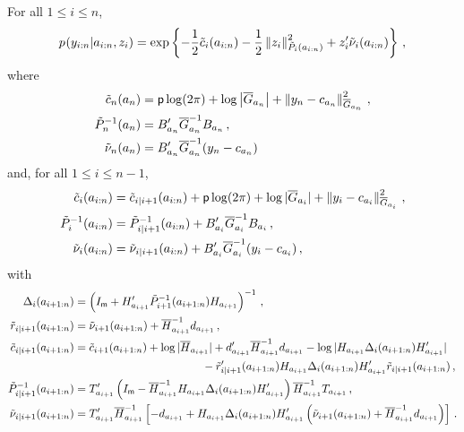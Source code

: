 \begin{lemma}
\label{lem:py}
For all $1\le i \le n$,
\begin{equation}
\label{eq:py}
p_{}(y_{i:n}|a_{i:n},z_i) =  \exp\left\{-\frac{1}{2}\tilde{c}_{i}(a_{i:n}) - \frac{1}{2}\normMat{\tilde{P}_{i}(a_{i:n})}{z_i}^2 + z'_i\tilde{\nu}_{i}(a_{i:n})\right\}\eqsp,
\end{equation}
where
\begin{align}
\tilde{c}_{n}(a_{n}) &= \dimy\log(2\pi) + \log \left|\barG_{a_n}\right| + \normMat{\barG_{a_n}}{y_n-c_{a_n}}^2\eqsp,\label{eq:cn}\\
\tilde{P}_{n}^{-1}(a_{n}) &=B'_{a_n}\barG_{a_n}^{-1}B_{a_n}\eqsp,\label{eq:Pn}\\
\tilde{\nu}_{n}(a_{n})&=B'_{a_n}\barG_{a_n}^{-1}(y_n-c_{a_n})\label{eq:nun}
\end{align}
and, for all $1\le i\le n-1$,
\begin{align}
\tilde{c}_{i}(a_{i:n}) &= \tilde{c}_{i|i+1}(a_{i:n}) + \dimy\log(2\pi)  + \log|\barG_{a_i}| + \normMat{\barG_{a_i}}{y_i-c_{a_i}}^2\eqsp,\label{eq:ck}\\
\tilde{P}_{i}^{-1}(a_{i:n}) &= \tilde{P}_{i|i+1}^{-1}(a_{i:n}) + B'_{a_i}\barG_{a_i}^{-1}B_{a_i}\eqsp,\label{eq:Pk}\\
\tilde{\nu}_{i}(a_{i:n})&=\tilde{\nu}_{i|i+1}(a_{i:n}) + B'_{a_i}\barG_{a_i}^{-1}(y_{i}-c_{a_{i}})\eqsp,\label{eq:nuk}
\end{align}
with
\begin{align*}
\Delta_{i}(a_{i+1:n}) &= \left(I_{\dimz} + H'_{a_{i+1}}\tilde{P}_{i+1}^{-1}(a_{i+1:n})H_{a_{i+1}}\right)^{-1}\eqsp,\\
\tilde{r}_{i|i+1}(a_{i+1:n})&= \tilde{\nu}_{i+1}(a_{i+1:n}) + \barH_{a_{i+1}}^{-1}d_{a_{i+1}}\eqsp,\\
\tilde{c}_{i|i+1}(a_{i+1:n}) &= \tilde{c}_{i+1}(a_{i+1:n}) + \log|\barH_{a_{i+1}}| + d'_{a_{i+1}}\barH_{a_{i+1}}^{-1}d_{a_{i+1}}-\log|H_{a_{i+1}}\Delta_{i}(a_{i+1:n})H'_{a_{i+1}}|\\
&\hspace{4.0cm} - \tilde{r}'_{i|i+1}(a_{i+1:n})H_{a_{i+1}}\Delta_{i}(a_{i+1:n})H'_{a_{i+1}}\tilde{r}_{i|i+1}(a_{i+1:n})\eqsp,\\
\tilde{P}_{i|i+1}^{-1}(a_{i+1:n}) &=T'_{a_{i+1}}\left(I_{\dimz}-\barH_{a_{i+1}}^{-1}H_{a_{i+1}}\Delta_{i}(a_{i+1:n})H'_{a_{i+1}}\right)\barH_{a_{i+1}}^{-1}T_{a_{i+1}}\eqsp,\\
\tilde{\nu}_{i|i+1}(a_{i+1:n})&=T'_{a_{i+1}}\barH_{a_{i+1}}^{-1}\left[-d_{a_{i+1}}+H_{a_{i+1}}\Delta_{i}(a_{i+1:n})H'_{a_{i+1}}\left(\tilde{\nu}_{i+1}(a_{i+1:n})+\barH_{a_{i+1}}^{-1}d_{a_{i+1}}\right)\right]\eqsp.
\end{align*}
\end{lemma}
